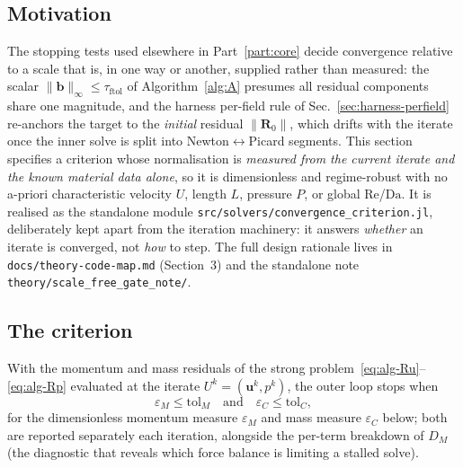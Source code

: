 \documentclass{article}
\newcommand{\code}[1]{\texttt{\small #1}}
\newcommand{\textftol}{\tau_{\mathrm{ftol}}}
\begin{document}
\subsection{Motivation}
The stopping tests used elsewhere in Part~\ref{part:core} decide convergence relative to a scale that
is, in one way or another, supplied rather than measured: the scalar
$\|\boldsymbol{b}\|_\infty \le \textftol$ of Algorithm~\ref{alg:A} presumes all residual components
share one magnitude, and the harness per-field rule of Sec.~\ref{sec:harness-perfield} re-anchors the
target to the \emph{initial} residual $\|\boldsymbol{R}_0\|$, which drifts with the iterate once the
inner solve is split into Newton$\leftrightarrow$Picard segments. This section specifies a criterion
whose normalisation is \emph{measured from the current iterate and the known material data alone}, so
it is dimensionless and regime-robust with no a-priori characteristic velocity $U$, length $L$,
pressure $P$, or global $\mathrm{Re}$/$\mathrm{Da}$. It is realised as the standalone module
\code{src/solvers/convergence\_criterion.jl}, deliberately kept apart from the iteration machinery: it
answers \emph{whether} an iterate is converged, not \emph{how} to step. The full design rationale lives
in \code{docs/theory-code-map.md} (Section~3) and the standalone note \code{theory/scale\_free\_gate\_note/}.

\subsection{The criterion}
With the momentum and mass residuals of the strong problem~\eqref{eq:alg-Ru}--\eqref{eq:alg-Rp}
evaluated at the iterate $U^k=(\boldsymbol{u}^k,p^k)$, the outer loop stops when
\begin{equation}
    \label{eq:cc-converged}
    \varepsilon_M \le \mathrm{tol}_M \quad\text{and}\quad \varepsilon_C \le \mathrm{tol}_C ,
\end{equation}
for the dimensionless momentum measure $\varepsilon_M$ and mass measure $\varepsilon_C$ below; both are
reported separately each iteration, alongside the per-term breakdown of $D_M$ (the diagnostic that
reveals which force balance is limiting a stalled solve).
\end{document}
